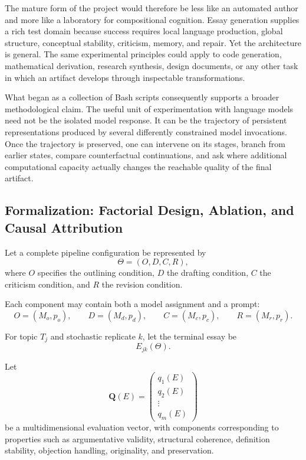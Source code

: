 \documentclass[11pt]{article}
\begin{document}
The mature form of the project would therefore be less like an automated author and more like a laboratory for compositional cognition. Essay generation supplies a rich test domain because success requires local language production, global structure, conceptual stability, criticism, memory, and repair. Yet the architecture is general. The same experimental principles could apply to code generation, mathematical derivation, research synthesis, design documents, or any other task in which an artifact develops through inspectable transformations.

What began as a collection of Bash scripts consequently supports a broader methodological claim. The useful unit of experimentation with language models need not be the isolated model response. It can be the trajectory of persistent representations produced by several differently constrained model invocations. Once the trajectory is preserved, one can intervene on its stages, branch from earlier states, compare counterfactual continuations, and ask where additional computational capacity actually changes the reachable quality of the final artifact.

\subsection{Formalization: Factorial Design, Ablation, and Causal Attribution}

Let a complete pipeline configuration be represented by
\[
    \Theta
    =
    (O,D,C,R),
\]
where \(O\) specifies the outlining condition, \(D\) the drafting condition, \(C\) the criticism condition, and \(R\) the revision condition.

Each component may contain both a model assignment and a prompt:
\[
    O=(M_o,p_o),\qquad
    D=(M_d,p_d),\qquad
    C=(M_c,p_c),\qquad
    R=(M_r,p_r).
\]

For topic \(T_j\) and stochastic replicate \(k\), let the terminal essay be
\[
    E_{jk}(\Theta).
\]

Let
\[
    \mathbf{Q}(E)
    =
    \begin{pmatrix}
    q_1(E)\\
    q_2(E)\\
    \vdots\\
    q_m(E)
    \end{pmatrix}
\]
be a multidimensional evaluation vector, with components corresponding to properties such as argumentative validity, structural coherence, definition stability, objection handling, originality, and preservation.
\end{document}
